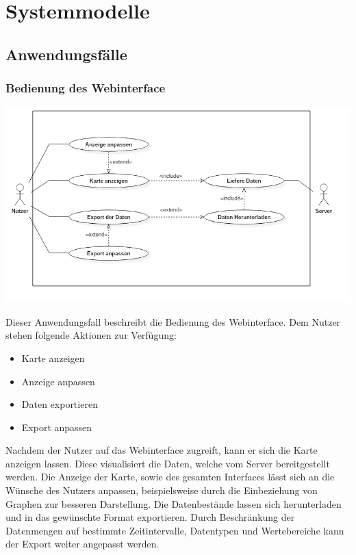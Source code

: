 \chapter{Systemmodelle}

\section{Anwendungsfälle}
    \subsection{Bedienung des Webinterface}
        \includegraphics[width=1\linewidth]{diagrams/UseCaseDiagram1_Final.png}
       
       Dieser Anwendungsfall beschreibt die Bedienung des Webinterface. Dem Nutzer stehen folgende Aktionen zur Verfügung:
       \begin{itemize}
            \item Karte anzeigen
            \item Anzeige anpassen
            \item Daten exportieren
            \item Export anpassen
        \end{itemize}
        Nachdem der Nutzer auf das Webinterface zugreift, kann er sich die Karte anzeigen lassen. Diese visualisiert die Daten, welche 
        vom Server bereitgestellt werden. Die Anzeige der Karte, sowie des gesamten Interfaces lässt sich an die Wünsche des Nutzers 
        anpassen, beispielsweise durch die Einbeziehung von Graphen zur besseren Darstellung. Die Datenbestände lassen sich 
        herunterladen und in das gewünschte Format exportieren. Durch Beschränkung der Datenmengen auf bestimmte Zeitintervalle, 
        Datentypen und Wertebereiche kann der Export weiter angepasst werden.
        
